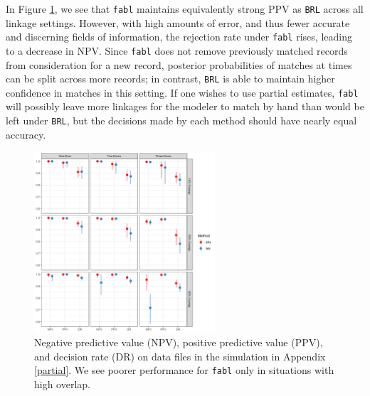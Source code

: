 \documentclass[ba]{imsart}
\begin{document}
In Figure \ref{fig:sadinle_simulation_partial}, we see that \texttt{fabl} maintains equivalently strong PPV as \texttt{BRL} across all linkage settings. However, with high amounts of error, and thus fewer accurate and discerning fields of information, the rejection rate under \texttt{fabl} rises, leading to a decrease in NPV. Since \texttt{fabl} does not remove previously matched records from consideration for a new record, posterior probabilities of matches at times can be split across more records; in contrast, \texttt{BRL} is able to maintain higher confidence in matches in this setting. If one wishes to use partial estimates, \texttt{fabl} will possibly leave more linkages for the modeler to match by hand than would be left under \texttt{BRL}, but the decisions made by each method should have nearly equal accuracy. 



\begin{figure}[t]
	\begin{center}
	        \includegraphics[width=0.6\textwidth]{finalFigures/figures/sadinle_sim_plot_partial_DR} 
		\caption{Negative predictive value (NPV), positive predictive value (PPV), and decision rate (DR) on data files in the simulation in Appendix \ref{partial}. We see poorer performance for \texttt{fabl} only in situations with high overlap.}
		\label{fig:sadinle_simulation_partial}
	\end{center}
\end{figure}
	
\end{document}
